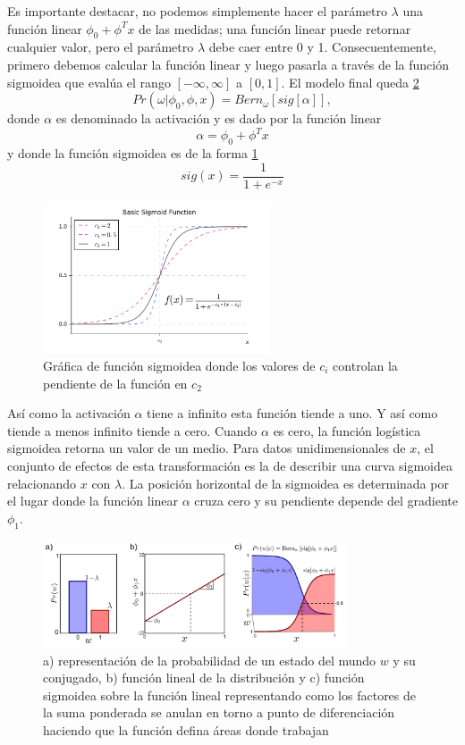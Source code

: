 \documentclass[letter,12pt]{report}
\begin{document}
Es importante destacar, no podemos simplemente hacer el parámetro $\lambda$ una función
linear $\phi_0+\phi^Tx$ de las medidas; una función linear puede retornar cualquier
valor, pero el parámetro $\lambda$ debe caer entre 0 y 1. Consecuentemente, primero
debemos calcular la función linear y luego pasarla a través de la función sigmoidea que
evalúa el rango $[-\infty,\infty]$ a $[0, 1]$. El modelo final queda \ref{fig:logistic}
$$Pr(\omega|\phi_0, \phi, x)=Bern_\omega [sig[\alpha]],$$
donde $\alpha$ es denominado la activación y es dado por la función linear
$$\alpha=\phi_0+\phi^Tx$$
y donde la función sigmoidea \cite{Sigmoid} es de la forma \ref{fig:sigmoid}
$$sig(x)=\frac{1}{1 + e^{-x}}$$

\begin{figure}[H]
    \centering
    \includegraphics[width=0.6\textwidth]{sigmoid}
    \caption{Gráfica de función sigmoidea donde los valores de $c_i$ controlan la pendiente
    de la función en $c_2$}
    \label{fig:sigmoid}
\end{figure}

Así como la activación $\alpha$ tiene a infinito esta función tiende a uno. Y así como
tiende a menos infinito tiende a cero. Cuando $\alpha$ es cero, la función logística
sigmoidea retorna un valor de un medio. Para datos unidimensionales de $x$, el conjunto
de efectos de esta transformación es la de describir una curva sigmoidea relacionando $x$
con $\lambda$. La posición horizontal de la sigmoidea es determinada por el lugar donde
la función linear $\alpha$ cruza cero y su pendiente depende del gradiente $\phi_1$.

\begin{figure}[H]
    \centering
    \includegraphics[width=0.8\textwidth]{logistic}
    \caption{a) representación de la probabilidad de un estado del mundo $w$ y su
        conjugado, b) función lineal de la distribución y c) función sigmoidea sobre la
        función lineal representando como los factores de la suma ponderada se anulan en torno a
    punto de diferenciación haciendo que la función defina áreas donde trabajan}
    \label{fig:logistic}
\end{figure}
\end{document}
